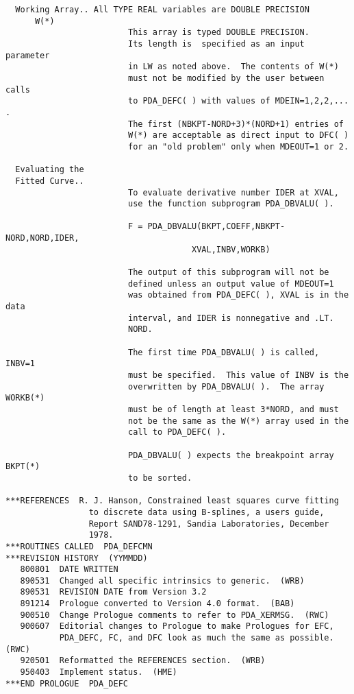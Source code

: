 \begin{verbatim}
  Working Array.. All TYPE REAL variables are DOUBLE PRECISION
      W(*)
                         This array is typed DOUBLE PRECISION.
                         Its length is  specified as an input parameter
                         in LW as noted above.  The contents of W(*)
                         must not be modified by the user between calls
                         to PDA_DEFC( ) with values of MDEIN=1,2,2,... .
                         The first (NBKPT-NORD+3)*(NORD+1) entries of
                         W(*) are acceptable as direct input to DFC( )
                         for an "old problem" only when MDEOUT=1 or 2.

  Evaluating the
  Fitted Curve..
                         To evaluate derivative number IDER at XVAL,
                         use the function subprogram PDA_DBVALU( ).

                         F = PDA_DBVALU(BKPT,COEFF,NBKPT-NORD,NORD,IDER,
                                      XVAL,INBV,WORKB)

                         The output of this subprogram will not be
                         defined unless an output value of MDEOUT=1
                         was obtained from PDA_DEFC( ), XVAL is in the data
                         interval, and IDER is nonnegative and .LT.
                         NORD.

                         The first time PDA_DBVALU( ) is called, INBV=1
                         must be specified.  This value of INBV is the
                         overwritten by PDA_DBVALU( ).  The array WORKB(*)
                         must be of length at least 3*NORD, and must
                         not be the same as the W(*) array used in the
                         call to PDA_DEFC( ).

                         PDA_DBVALU( ) expects the breakpoint array BKPT(*)
                         to be sorted.

***REFERENCES  R. J. Hanson, Constrained least squares curve fitting
                 to discrete data using B-splines, a users guide,
                 Report SAND78-1291, Sandia Laboratories, December
                 1978.
***ROUTINES CALLED  PDA_DEFCMN
***REVISION HISTORY  (YYMMDD)
   800801  DATE WRITTEN
   890531  Changed all specific intrinsics to generic.  (WRB)
   890531  REVISION DATE from Version 3.2
   891214  Prologue converted to Version 4.0 format.  (BAB)
   900510  Change Prologue comments to refer to PDA_XERMSG.  (RWC)
   900607  Editorial changes to Prologue to make Prologues for EFC,
           PDA_DEFC, FC, and DFC look as much the same as possible.  (RWC)
   920501  Reformatted the REFERENCES section.  (WRB)
   950403  Implement status.  (HME)
***END PROLOGUE  PDA_DEFC
\end{verbatim}

